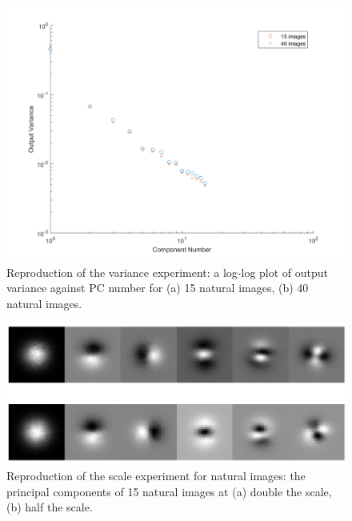 \begin{figure}
    \centering
    \includegraphics[scale=0.55]{figures/Figure5.png}
    \caption{Reproduction of the variance experiment: a log-log plot of output variance against PC number for (a) 15 natural images, (b) 40 natural images.}
    \label{fig:Figure5}
\end{figure}

 \begin{figure}
    \centering
    \includegraphics[scale=0.55]{figures/Figure6.png}
    \caption{Reproduction of the scale experiment for natural images: the principal components of 15 natural images at (a) double the scale, (b) half the scale.}
    \label{fig:Figure6}
\end{figure}

